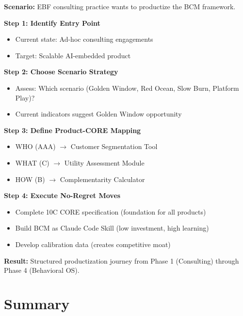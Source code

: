\begin{tcolorbox}[colback=green!5!white, colframe=green!75!black,
    title=Worked Example: From Consulting to Product]

\textbf{Scenario:} EBF consulting practice wants to productize the BCM framework.

\textbf{Step 1: Identify Entry Point}
\begin{itemize}[nosep]
    \item Current state: Ad-hoc consulting engagements
    \item Target: Scalable AI-embedded product
\end{itemize}

\textbf{Step 2: Choose Scenario Strategy}
\begin{itemize}[nosep]
    \item Assess: Which scenario (Golden Window, Red Ocean, Slow Burn, Platform Play)?
    \item Current indicators suggest Golden Window opportunity
\end{itemize}

\textbf{Step 3: Define Product-CORE Mapping}
\begin{itemize}[nosep]
    \item WHO (AAA) $\rightarrow$ Customer Segmentation Tool
    \item WHAT (C) $\rightarrow$ Utility Assessment Module
    \item HOW (B) $\rightarrow$ Complementarity Calculator
\end{itemize}

\textbf{Step 4: Execute No-Regret Moves}
\begin{itemize}[nosep]
    \item Complete 10C CORE specification (foundation for all products)
    \item Build BCM as Claude Code Skill (low investment, high learning)
    \item Develop calibration data (creates competitive moat)
\end{itemize}

\textbf{Result:} Structured productization journey from Phase 1 (Consulting) through Phase 4 (Behavioral OS).

\end{tcolorbox}


\section{Summary}
\label{sec:vvv-summary}


